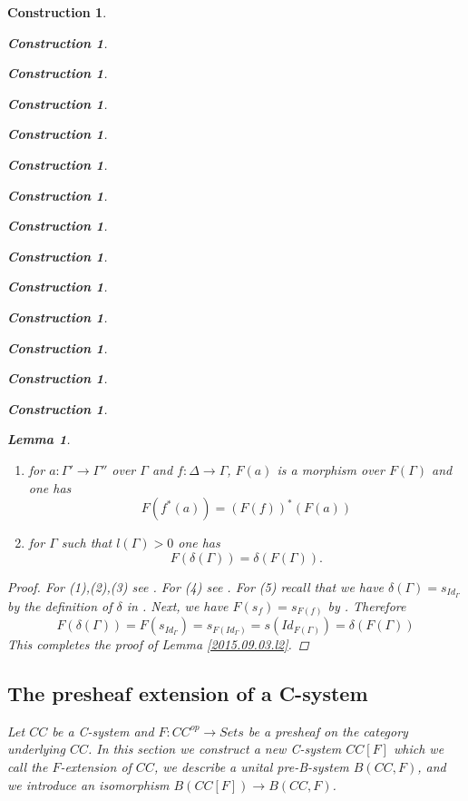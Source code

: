 \documentclass[onecolumn,12pt]{amsart}
\newtheorem{lemma}[proposition]{Lemma}
\numberwithin{proposition}{subsection}
\newtheorem{construction}[proposition]{Construction}
\newcommand{\sr}{\rightarrow}
\begin{document}
\begin{construction}
\begin{construction}
\begin{construction}
\begin{construction}
\begin{construction}
\begin{construction}
\begin{construction}
\begin{construction}
\begin{construction}
\begin{construction}
\begin{construction}
\begin{construction}
\begin{construction}
\begin{construction}
\begin{lemma}
\begin{enumerate}
\begin{equation*}
\begin{split}
      F(q(f,\Gamma'))&=q(F(f),F(\Gamma'))
    \end{split}
  \end{equation*}
\item for $a:\Gamma'\sr \Gamma''$ over $\Gamma$ and $f:\Delta\sr \Gamma$, $F(a)$ is a morphism over $F(\Gamma)$ and one has
%
$$F(f^*(a))=(F(f))^*(F(a))$$
%
\item for $\Gamma$ such that $l(\Gamma)>0$ one has
%
$$F(\delta(\Gamma))=\delta(F(\Gamma)).$$
%
\end{enumerate}
\end{lemma}
%
\begin{proof}
For (1),(2),(3) see \cite[Lemma 2.5]{fromunivwithPiI}. For (4) see \cite[Lemma
  2.14]{fromunivwithPiI}. For (5) recall that we have
$\delta(\Gamma)=s_{Id_{\Gamma}}$ by the definition of $\delta$ in
\cite[p.~131]{Csubsystems}. Next, we have $F(s_f)=s_{F(f)}$ by \cite[Lemma
  3.4]{Cfromauniverse}. Therefore
%
$$F(\delta(\Gamma))=F(s_{Id_{\Gamma}})=s_{F(Id_{\Gamma})}=s(Id_{F(\Gamma)})=\delta(F(\Gamma))$$
%
This completes the proof of Lemma \ref{2015.09.03.l2}.  
\end{proof}
%
\subsection{The presheaf extension of a C-system}
\label{Fext}
%
Let $CC$ be a C-system and $F:CC^{op}\sr Sets$ be a presheaf on the category
underlying $CC$. In this section we construct a new C-system $CC[F]$ which we
call the {\em $F$-extension of $CC$}, we describe a unital pre-B-system $B(CC,F)$, and we introduce
an isomorphism $B(CC[F])\sr B(CC,F)$.


\end{construction}
\end{construction}
\end{construction}
\end{construction}
\end{construction}
\end{construction}
\end{construction}
\end{construction}
\end{construction}
\end{construction}
\end{construction}
\end{construction}
\end{construction}
\end{construction}
\end{document}
